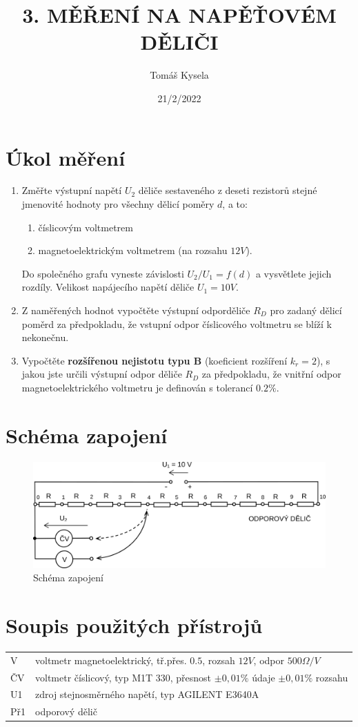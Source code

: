 \documentclass[5pt]{article}
\title{\textbf{3. MĚŘENÍ NA NAPĚŤOVÉM DĚLIČI}}
\author{Tomáš Kysela}
\date{21/2/2022}
\begin{document}
\maketitle
\thispagestyle{empty}

\section{Úkol měření}
\begin{enumerate}
\item Změřte výstupní napětí $U_2$ děliče sestaveného z deseti rezistorů stejné jmenovité hodnoty pro všechny dělicí poměry $d$, a to:
   \begin{enumerate}
   \item číslicovým voltmetrem
   \item magnetoelektrickým voltmetrem (na rozsahu $12V$).
   \end{enumerate}
   Do společného grafu vyneste závislosti $U_2 /U_1 = f(d)$ a vysvětlete jejich rozdíly. Velikost napájecího napětí děliče $U_1 = 10 V$.
   
\item Z naměřených hodnot vypočtěte výstupní odporděliče $R_D$ pro zadaný dělicí poměrd za předpokladu, že vstupní odpor číslicového voltmetru se blíží k nekonečnu.

\item Vypočtěte \textbf{rozšířenou nejistotu typu B} (koeficient rozšíření $k_r = 2$), s jakou jste určili výstupní odpor děliče $R_D$ za předpokladu, že vnitřní odpor magnetoelektrického voltmetru je definován s tolerancí $0.2\%$.
\end{enumerate}
\section{Schéma zapojení}
\begin{figure}[htp]
\centering
\includegraphics[scale=1.00]{LAB3.png}
\caption{Schéma zapojení}
\end{figure}
\section{Soupis použitých přístrojů}
\begin{tabular}{ll}
	V & voltmetr magnetoelektrický, tř.přes. $0.5$, rozsah $12 V$, odpor $500 \Omega/V$\\
	ČV & voltmetr číslicový, typ M1T 330, přesnost $\pm 0,01\%$ údaje $\pm 0,01\%$ rozsahu\\
	U1 & zdroj stejnosměrného napětí, typ AGILENT E3640A\\
	Př1 & odporový dělič
\end{tabular}
\end{document}
